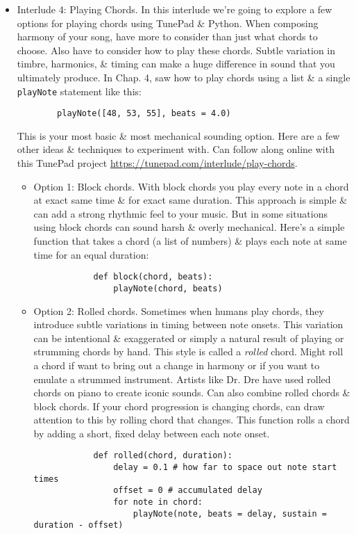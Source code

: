 \documentclass{article}
\begin{document}
\begin{itemize}
	\item {\sf Interlude 4: Playing Chords.} In this interlude we're going to explore a few options for playing chords using TunePad \& Python. When composing harmony of your song, have more to consider than just what chords to choose. Also have to consider how to play these chords. Subtle variation in timbre, harmonics, \& timing can make a huge difference in sound that you ultimately produce. In Chap. 4, saw how to play chords using a list \& a single {\tt playNote} statement like this:
	\begin{verbatim}
		playNote([48, 53, 55], beats = 4.0)
	\end{verbatim}
	This is your most basic \& most mechanical sounding option. Here are a few other ideas \& techniques to experiment with. Can follow along online with this TunePad project \url{https://tunepad.com/interlude/play-chords}.
	\begin{itemize}
		\item {\sf Option 1: Block chords.} With block chords you play every note in a chord at exact same time \& for exact same duration. This approach is simple \& can add a strong rhythmic feel to your music. But in some situations using block chords can sound harsh \& overly mechanical. Here's a simple function that takes a chord (a list of numbers) \& plays each note at same time for an equal duration:
		\begin{verbatim}
			def block(chord, beats):
			    playNote(chord, beats)
		\end{verbatim}
		\item {\sf Option 2: Rolled chords.} Sometimes when humans play chords, they introduce subtle variations in timing between note onsets. This variation can be intentional \& exaggerated or simply a natural result of playing or strumming chords by hand. This style is called a {\it rolled} chord. Might roll a chord if want to bring out a change in harmony or if you want to emulate a strummed instrument. Artists like Dr. {\sc Dre} have used rolled chords on piano to create iconic sounds. Can also combine rolled chords \& block chords. If your chord progression is changing chords, can draw attention to this by rolling chord that changes. This function rolls a chord by adding a short, fixed delay between each note onset.
		\begin{verbatim}
			def rolled(chord, duration):
			    delay = 0.1 # how far to space out note start times
			    offset = 0 # accumulated delay
			    for note in chord:
			        playNote(note, beats = delay, sustain = duration - offset)

\end{verbatim}
\end{itemize}
\end{itemize}
\end{document}
